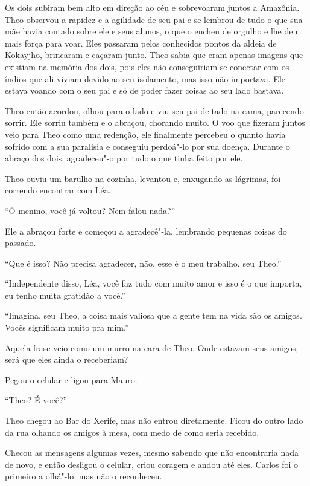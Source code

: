 Os dois subiram bem alto em direção ao céu e sobrevoaram juntos a
Amazônia. Theo observou a rapidez e a agilidade de seu pai e se lembrou
de tudo o que sua mãe havia contado sobre ele e seus alunos, o que o
encheu de orgulho e lhe deu mais força para voar. Eles passaram pelos
conhecidos pontos da aldeia de Kokayjho, brincaram e caçaram junto. Theo
sabia que eram apenas imagens que existiam na memória dos dois, pois
eles não conseguiriam se conectar com os índios que ali viviam devido ao
seu isolamento, mas isso não importava. Ele estava voando com o seu pai
e só de poder fazer coisas ao seu lado bastava.

Theo então acordou, olhou para o lado e viu seu pai deitado na cama,
parecendo sorrir. Ele sorriu também e o abraçou, chorando muito. O voo
que fizeram juntos veio para Theo como uma redenção, ele finalmente
percebeu o quanto havia sofrido com a sua paralisia e conseguiu
perdoá"-lo por sua doença. Durante o abraço dos dois, agradeceu"-o por
tudo o que tinha feito por ele.

Theo ouviu um barulho na cozinha, levantou e, enxugando as lágrimas, foi
correndo encontrar com Léa.

``Ô menino, você já voltou? Nem falou nada?''

Ele a abraçou forte e começou a agradecê"-la, lembrando pequenas coisas
do passado.

``Que é isso? Não precisa agradecer, não, esse é o meu trabalho, seu
Theo.''

``Independente disso, Léa, você faz tudo com muito amor e isso é o que
importa, eu tenho muita gratidão a você.''

``Imagina, seu Theo, a coisa mais valiosa que a gente tem na vida são os
amigos. Vocês significam muito pra mim.''

Aquela frase veio como um murro na cara de Theo. Onde estavam seus
amigos, será que eles ainda o receberiam?

Pegou o celular e ligou para Mauro.

``Theo? É você?''

\asterisc


Theo chegou ao Bar do Xerife, mas não entrou diretamente. Ficou do outro
lado da rua olhando os amigos à mesa, com medo de como seria recebido.

Checou as mensagens algumas vezes, mesmo sabendo que não encontraria
nada de novo, e então desligou o celular, criou coragem e andou até eles.
Carlos foi o primeiro a olhá"-lo, mas não o reconheceu.

